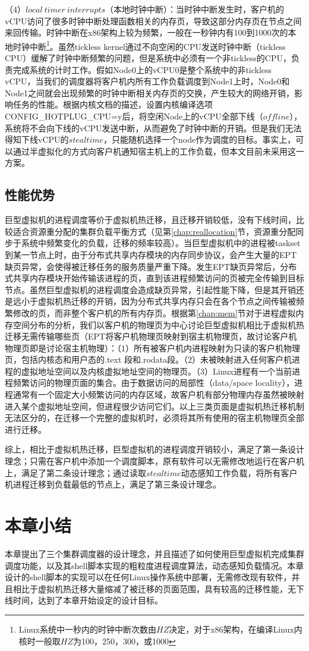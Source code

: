 （4）$local\ timer\ interrupts$（本地时钟中断）：当时钟中断发生时，客户机的vCPU访问了很多时钟中断处理函数相关的内存页，导致这部分内存页在节点之间来回传输。时钟中断在x86架构上较为频繁，一般在一秒钟内有100到1000次的本地时钟中断\footnote{Linux系统中一秒内的时钟中断次数由$HZ$决定，对于x86架构，在编译Linux内核时一般取$HZ$为100，250，300，或1000}。虽然tickless kernel通过不向空闲的CPU发送时钟中断（tickless CPU）缓解了时钟中断频繁的问题，但是系统中必须有一个非tickless的CPU，负责完成系统的计时工作。假如Node0上的vCPU0是整个系统中的非tickless vCPU，当我们的调度器将客户机内所有工作负载调度到Node1上时，Node0和Node1之间就会出现频繁的时钟中断相关内存页的交换，产生较大的网络开销，影响任务的性能。根据内核文档的描述，设置内核编译选项CONFIG\_HOTPLUG\_CPU=y后，将空闲Node上的vCPU全部下线（$offline$），系统将不会向下线的vCPU发送中断，从而避免了时钟中断的开销。但是我们无法得知下线vCPU的$steal time$，只能随机选择一个node作为调度的目标。事实上，可以通过半虚拟化的方式向客户机通知宿主机上的工作负载，但本文目前未采用这一方案。

\subsection{性能优势}
巨型虚拟机的进程调度等价于虚拟机热迁移，且迁移开销较低，没有下线时间，比较适合资源重分配的集群负载平衡方式（见第\ref{chap:reallocation}节，资源重分配同步于系统中频繁变化的负载，迁移的频率较高）。当巨型虚拟机中的进程被taskset到某一节点上时，由于分布式共享内存模块的内存同步协议，会产生大量的EPT缺页异常，会使得被迁移任务的服务质量严重下降。发生EPT缺页异常后，分布式共享内存模块开始传输该进程的页，直到该进程频繁访问的页被完全传输到目标节点。虽然巨型虚拟机的进程调度会造成缺页异常，引起性能下降，但是其开销还是远小于虚拟机热迁移的开销，因为分布式共享内存只会在各个节点之间传输被频繁修改的页，而非整个客户机的所有内存页。根据第\ref{chap:mem}节对于进程虚拟内存空间分布的分析，我们以客户机的物理页为中心讨论巨型虚拟机相比于虚拟机热迁移无需传输哪些页（EPT将客户机物理页映射到宿主机物理页，故讨论客户机物理页即是讨论宿主机物理）：（1）所有被客户机内进程映射为只读的客户机物理页，包括内核态和用户态的.text 段和.rodata段。（2）未被映射进入任何客户机进程的虚拟地址空间以及内核虚拟地址空间的物理页。（3）Linux进程有一个当前进程频繁访问的物理页面的集合。由于数据访问的局部性（data/space locality），进程通常有一个固定大小频繁访问的内存区域，故客户机有部分物理内存虽然被映射进入某个虚拟地址空间，但进程很少访问它们。以上三类页面是虚拟机热迁移机制无法区分的，在迁移一个完整的虚拟机时，必须将其所有使用的宿主机物理页全部进行迁移。

综上，相比于虚拟机热迁移，巨型虚拟机的进程调度开销较小，满足了第一条设计理念；只需在客户机中添加一个调度脚本，原有软件可以无需修改地运行在客户机上，满足了第二条设计理念；通过读取$steal time$动态感知工作负载，将所有客户机进程迁移到负载最低的节点上，满足了第三条设计理念。

\section{本章小结}
本章提出了三个集群调度器的设计理念，并且描述了如何使用巨型虚拟机完成集群调度功能，以及其shell脚本实现的粗粒度进程调度算法，动态感知负载情况。本章设计的shell脚本的实现可以在任何Linux操作系统中部署，无需修改现有软件，并且相比于虚拟机热迁移大量缩减了被迁移的页面范围，具有较高的迁移性能，无下线时间，达到了本章开始设定的设计目标。